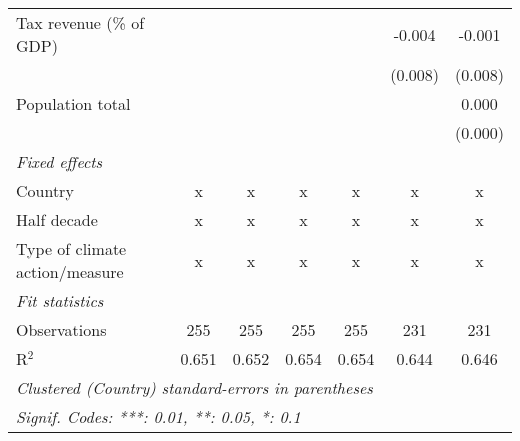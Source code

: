 \begin{tabular}{lcccccc}
   Tax revenue (\% of GDP)                     &         &         &              &              & -0.004        & -0.001\\   
                                               &         &         &              &              & (0.008)       & (0.008)\\   
   Population total                            &         &         &              &              &               & 0.000\\   
                                               &         &         &              &              &               & (0.000)\\   
   \emph{Fixed effects}\\
   Country                                     & x       & x       & x            & x            & x             & x\\  
   Half decade                                 & x       & x       & x            & x            & x             & x\\  
   Type of climate action/measure              & x       & x       & x            & x            & x             & x\\  
   \midrule \emph{Fit statistics}\\
   Observations                                & 255     & 255     & 255          & 255          & 231           & 231\\  
   R$^2$                                       & 0.651   & 0.652   & 0.654        & 0.654        & 0.644         & 0.646\\  
   \midrule
   \multicolumn{7}{l}{\emph{Clustered (Country) standard-errors in parentheses}}\\
   \multicolumn{7}{l}{\emph{Signif. Codes: ***: 0.01, **: 0.05, *: 0.1}}\\
\end{tabular}
\par\endgroup


